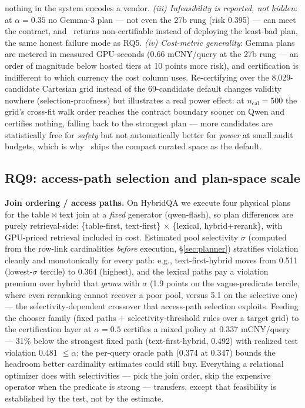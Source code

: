 nothing in the system encodes a vendor. \emph{(iii) Infeasibility is
reported, not hidden}: at $\alpha{=}0.35$ no Gemma-3 plan --- not even
the 27b rung (risk 0.395) --- can meet the contract, and \system\
returns non-certifiable instead of deploying the least-bad plan, the
same honest failure mode as RQ5. \emph{(iv) Cost-metric generality}:
Gemma plans are metered in measured GPU-seconds (0.66 mCNY/query at
the 27b rung --- an order of magnitude below hosted tiers at 10 points
more risk), and certification is indifferent to which currency the
cost column uses. Re-certifying over the 8{,}029-candidate Cartesian
grid instead of the 69-candidate default changes validity nowhere
(selection-proofness) but illustrates a real power effect: at
$n_{\mathrm{cal}}{=}500$ the grid's cross-fit walk order reaches the
contract boundary sooner on Qwen and certifies nothing, falling back
to the strongest plan --- more candidates are statistically free for
\emph{safety} but not automatically better for \emph{power} at small
audit budgets, which is why \system\ ships the compact curated space
as the default.

\subsection{RQ9: access-path selection and plan-space scale}
\label{sec:exp-system}

\textbf{Join ordering / access paths.} On HybridQA we execute four
physical plans for the table$\bowtie$text join at a \emph{fixed}
generator (qwen-flash), so plan differences are purely retrieval-side:
\{table-first, text-first\} $\times$ \{lexical, hybrid+rerank\}, with
GPU-priced retrieval included in cost. Estimated pool selectivity
$\sigma$ (computed from the row-link cardinalities \emph{before}
execution, \S\ref{sec:planner}) stratifies violation cleanly and
monotonically for every path: e.g., text-first-hybrid moves from 0.511
(lowest-$\sigma$ tercile) to 0.364 (highest), and the lexical paths pay
a violation premium over hybrid that \emph{grows} with $\sigma$ (1.9
points on the vague-predicate tercile, where even reranking cannot
recover a poor pool, versus 5.1 on the selective one) --- the
selectivity-dependent crossover that access-path selection exploits.
Feeding the chooser family (fixed paths + selectivity-threshold rules
over a target grid) to the certification layer at $\alpha{=}0.5$
certifies a mixed policy at 0.337 mCNY/query --- 31\% below the
strongest fixed path (text-first-hybrid, 0.492) with realized test
violation 0.481 $\le \alpha$; the per-query oracle path (0.374 at
0.347) bounds the headroom better cardinality estimates could still
buy. Everything a relational optimizer does with selectivities ---
pick the join order, skip the expensive operator when the predicate is
strong --- transfers, except that feasibility is established by the
test, not by the estimate.

